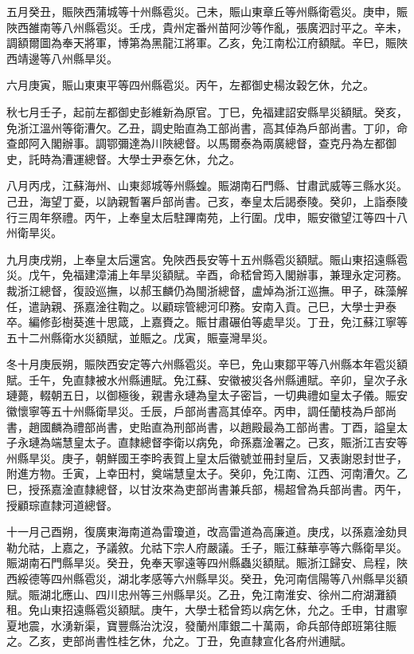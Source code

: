 \begin{pinyinscope}
五月癸丑，賑陜西蒲城等十州縣雹災。己未，賑山東章丘等州縣衛雹災。庚申，賑陜西雒南等八州縣雹災。壬戌，貴州定番州苗阿沙等作亂，張廣泗討平之。辛未，調額爾圖為奉天將軍，博第為黑龍江將軍。乙亥，免江南松江府額賦。辛巳，賑陜西靖邊等八州縣旱災。

六月庚寅，賑山東東平等四州縣雹災。丙午，左都御史楊汝穀乞休，允之。

秋七月壬子，起前左都御史彭維新為原官。丁巳，免福建詔安縣旱災額賦。癸亥，免浙江溫州等衛漕欠。乙丑，調史貽直為工部尚書，高其倬為戶部尚書。丁卯，命查郎阿入閣辦事。調鄂彌達為川陜總督。以馬爾泰為兩廣總督，查克丹為左都御史，託時為漕運總督。大學士尹泰乞休，允之。

八月丙戌，江蘇海州、山東郯城等州縣蝗。賑湖南石門縣、甘肅武威等三縣水災。己丑，海望丁憂，以訥親暫署戶部尚書。己亥，奉皇太后謁泰陵。癸卯，上詣泰陵行三周年祭禮。丙午，上奉皇太后駐蹕南苑，上行圍。戊申，賑安徽望江等四十八州衛旱災。

九月庚戌朔，上奉皇太后還宮。免陜西長安等十五州縣雹災額賦。賑山東招遠縣雹災。戊午，免福建漳浦上年旱災額賦。辛酉，命嵇曾筠入閣辦事，兼理永定河務。裁浙江總督，復設巡撫，以郝玉麟仍為閩浙總督，盧焯為浙江巡撫。甲子，硃藻解任，遣訥親、孫嘉淦往鞫之。以顧琮管總河印務。安南入貢。己巳，大學士尹泰卒。編修彭樹葵進十思箴，上嘉賚之。賑甘肅碾伯等處旱災。丁丑，免江蘇江寧等五十二州縣衛水災額賦，並賑之。戊寅，賑臺灣旱災。

冬十月庚辰朔，賑陜西安定等六州縣雹災。辛巳，免山東鄒平等八州縣本年雹災額賦。壬午，免直隸被水州縣逋賦。免江蘇、安徽被災各州縣逋賦。辛卯，皇次子永璉薨，輟朝五日，以御極後，親書永璉為皇太子密旨，一切典禮如皇太子儀。賑安徽懷寧等五十州縣衛旱災。壬辰，戶部尚書高其倬卒。丙申，調任蘭枝為戶部尚書，趙國麟為禮部尚書，史貽直為刑部尚書，以趙殿最為工部尚書。丁酉，謚皇太子永璉為端慧皇太子。直隸總督李衛以病免，命孫嘉淦署之。己亥，賑浙江吉安等州縣旱災。庚子，朝鮮國王李昑表賀上皇太后徽號並冊封皇后，又表謝恩封世子，附進方物。壬寅，上幸田村，奠端慧皇太子。癸卯，免江南、江西、河南漕欠。乙巳，授孫嘉淦直隸總督，以甘汝來為吏部尚書兼兵部，楊超曾為兵部尚書。丙午，授顧琮直隸河道總督。

十一月己酉朔，復廣東海南道為雷瓊道，改高雷道為高廉道。庚戌，以孫嘉淦劾貝勒允祜，上嘉之，予議敘。允祜下宗人府嚴議。壬子，賑江蘇華亭等六縣衛旱災。賑湖南石門縣旱災。癸丑，免奉天寧遠等四州縣蟲災額賦。賑浙江歸安、烏程，陜西綏德等四州縣雹災，湖北孝感等六州縣旱災。癸丑，免河南信陽等八州縣旱災額賦。賑湖北應山、四川忠州等三州縣旱災。乙丑，免江南淮安、徐州二府湖灘額租。免山東招遠縣雹災額賦。庚午，大學士嵇曾筠以病乞休，允之。壬申，甘肅寧夏地震，水湧新渠，寶豐縣治沈沒，發蘭州庫銀二十萬兩，命兵部侍郎班第往賑之。乙亥，吏部尚書性桂乞休，允之。丁丑，免直隸宣化各府州逋賦。


\end{pinyinscope}

